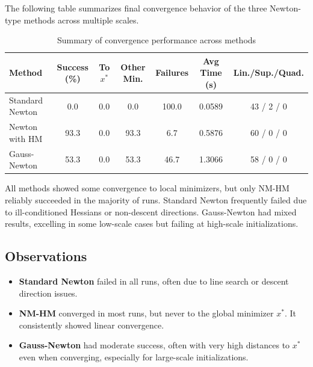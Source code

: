 \documentclass[12pt]{article}
\begin{document}
The following table summarizes final convergence behavior of the three Newton-type methods across multiple scales.

\begin{table}[h!]
\centering
\small
\begin{tabular}{|l|c|c|c|c|c|c|}
\hline
\textbf{Method} & \textbf{Success (\%)} & \textbf{To \(x^*\)} & \textbf{Other Min.} & \textbf{Failures} & \textbf{Avg Time (s)} & \textbf{Lin./Sup./Quad.} \\
\hline
Standard Newton & 0.0 & 0.0 & 0.0 & 100.0 & 0.0589 & 43 / 2 / 0 \\
Newton with HM  & 93.3 & 0.0 & 93.3 & 6.7   & 0.5876 & 60 / 0 / 0 \\
Gauss-Newton    & 53.3 & 0.0 & 53.3 & 46.7  & 1.3066 & 58 / 0 / 0 \\
\hline
\end{tabular}
\caption{Summary of convergence performance across methods}
\end{table}



All methods showed some convergence to local minimizers, but only NM-HM reliably succeeded in the majority of runs. Standard Newton frequently failed due to ill-conditioned Hessians or non-descent directions. Gauss-Newton had mixed results, excelling in some low-scale cases but failing at high-scale initializations.

\subsection*{Observations}
\begin{itemize}
  \item \textbf{Standard Newton} failed in all runs, often due to line search or descent direction issues.
  \item \textbf{NM-HM} converged in most runs, but never to the global minimizer $x^*$. It consistently showed linear convergence.
  \item \textbf{Gauss-Newton} had moderate success, often with very high distances to $x^*$ even when converging, especially for large-scale initializations.
\end{itemize}
\end{document}
